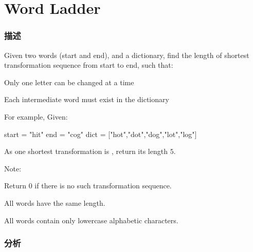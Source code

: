 \section{Word Ladder} %
\label{sec:word-ladder}


\subsubsection{描述}
Given two words (start and end), and a dictionary, find the length of shortest transformation sequence from start to end, such that:
\begindot
\item Only one letter can be changed at a time
\item Each intermediate word must exist in the dictionary
\myenddot

For example, Given:

\begin{Code}
	start = "hit"
	end = "cog"
	dict = ["hot","dot","dog","lot","log"]
\end{Code}
As one shortest transformation is , return its length $5$.

Note:
\begindot
\item Return 0 if there is no such transformation sequence.
\item All words have the same length.
\item All words contain only lowercase alphabetic characters.
\myenddot


\subsubsection{分析}


